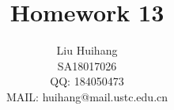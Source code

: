 
\title{
    Homework 13
}

\author{\name Liu Huihang  \\
        \addr SA18017026  \\
        QQ: 184050473 \\
        MAIL: huihang@mail.ustc.edu.cn
}


\maketitle